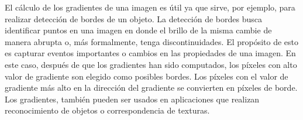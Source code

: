 	 El cálculo de los gradientes de una imagen es útil ya que sirve, por ejemplo, para realizar detección de bordes de un objeto. La detección de bordes busca identificar puntos en una imagen en donde el brillo de la misma cambie de manera abrupta o, más formalmente, tenga discontinuidades. El propósito de esto es capturar eventos importantes o cambios en las propiedades de una imagen. En este caso, después de que los gradientes han sido computados, los píxeles con alto valor de gradiente son elegido como posibles bordes. Los píxeles con el valor de gradiente más alto en la dirección del gradiente se convierten en píxeles de borde. Los gradientes, también pueden ser usados en aplicaciones que realizan reconocimiento de objetos o correspondencia de texturas.	 
